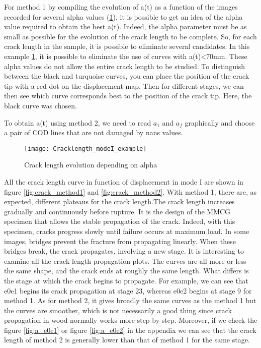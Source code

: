 For method 1 by compiling the evolution of a(t) as a function of the images recorded for several alpha values (\ref{fig:Cracklength_modeI_example}), it is possible to get an idea of the alpha value required to obtain the best a(t). Indeed, the alpha parameter must be as small as possible for the evolution of the crack length to be complete. So, for each crack length in the sample, it is possible to eliminate several candidates. In this example \ref{fig:Cracklength_modeI_example}, it is possible to eliminate the use of curves with a(t)<70mm. These alpha values do not allow the entire crack length to be studied. To distinguish between the black and turquoise curves, you can place the position of the crack tip with a red dot on the displacement map. Then for different stages, we can then see which curve corresponds best to the position of the crack tip. Here, the black curve was chosen.

To obtain a(t) using method 2, we need to read $a_1$ and $a_f$ graphically and choose a pair of COD lines that are not damaged by nans values.

\begin{figure}[H]
	\centering
	\texttt{[image: Cracklength\_modeI\_example]}
	\caption{Crack length evolution depending on alpha}
	\label{fig:Cracklength_modeI_example}
\end{figure}

All the crack length curve in function of displacement in mode I are shown in figure \ref{fig:crack_method1} and \ref{fig:crack_method2}. 
With method 1, there are, as expected, different plateaus for the crack length.The crack length increases gradually and continuously before rupture. It is the design of the MMCG specimen that allows the stable propagation of the crack. Indeed, with this specimen, cracks progress slowly until failure occurs at maximum load. In some images, bridges prevent the fracture from propagating linearly. When these bridges break, the crack propagates, involving a new stage. It is interesting to examine all the crack length propagation plots.  The curves are all more or less the same shape, and the crack ends at roughly the same length. What differs is the stage at which the crack begins to propagate. For example, we can see that e0e1 begins its crack propagation at stage 23, whereas e0e2 begins at stage 9 for method 1.
As for method 2, it gives broadly the same curves as the method 1 but the curves are smoother, which is not necessarily a good thing since crack propagation in wood normally works more step by step. Moreover, if we check the figure \ref{fig:a_e0e1} or figure \ref{fig:a_e0e2} in the appendix  we can see that the crack length of method 2 is generally lower than that of method 1 for the same stage.

